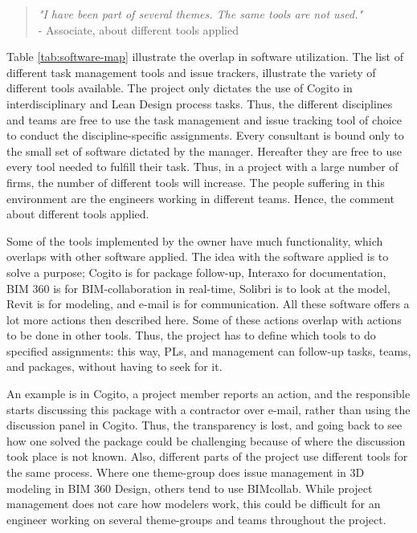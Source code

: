 \begin{quote}
    \textit{"I have been part of several themes. The same tools are not used."}
    \\ - Associate, about different tools applied
\end{quote}

Table \ref{tab:software-map} illustrate the overlap in software utilization. The list of different task management tools and issue trackers, illustrate the variety of different tools available. The project only dictates the use of Cogito in interdisciplinary and Lean Design process tasks. Thus, the different disciplines and teams are free to use the task management and issue tracking tool of choice to conduct the discipline-specific assignments. Every consultant is bound only to the small set of software dictated by the manager. Hereafter they are free to use every tool needed to fulfill their task. Thus, in a project with a large number of firms, the number of different tools will increase. The people suffering in this environment are the engineers working in different teams. Hence, the comment about different tools applied. 

Some of the tools implemented by the owner have much functionality, which overlaps with other software applied. The idea with the software applied is to solve a purpose; Cogito is for package follow-up, Interaxo for documentation, BIM 360 is for BIM-collaboration in real-time, Solibri is to look at the model, Revit is for modeling, and e-mail is for communication. All these software offers a lot more actions then described here. Some of these actions overlap with actions to be done in other tools. Thus, the project has to define which tools to do specified assignments: this way, PLs, and management can follow-up tasks, teams, and packages, without having to seek for it. 

An example is in Cogito, a project member reports an action, and the responsible starts discussing this package with a contractor over e-mail, rather than using the discussion panel in Cogito. Thus, the transparency is lost, and going back to see how one solved the package could be challenging because of where the discussion took place is not known. Also, different parts of the project use different tools for the same process. Where one theme-group does issue management in 3D modeling in BIM 360 Design, others tend to use BIMcollab. While project management does not care how modelers work, this could be difficult for an engineer working on several theme-groups and teams throughout the project.

